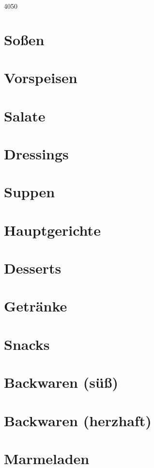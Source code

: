 \documentclass[11pt, a4paper, twoside]{book} %
\makeatletter
\newcommand\HUGE{\@setfontsize\Huge{40}{50}}
\makeatother
\begin{document}
\renewcommand{\indexname}{Stichwortverzeichnis}

\justify
\setlength\parindent{0pt}

\thispagestyle{empty}
\vspace*{3cm}
\begin{center}
{\HUGE{\textsc{}}}
\vspace{2cm}
\end{center}
\vspace{3cm}
\newpage

\tableofcontents

\cleardoublepage
{}
\printindex

\cleardoublepage
{}

\chapter{So\ss{}en}
\thispagestyle{empty}

\chapter{Vorspeisen}
\thispagestyle{empty}

\chapter{Salate}
\thispagestyle{empty}

\chapter{Dressings}
\thispagestyle{empty}

\chapter{Suppen}
\thispagestyle{empty}

\chapter{Hauptgerichte}
\thispagestyle{empty}

\chapter{Desserts}
\thispagestyle{empty}

\chapter{Getr\"anke}
\thispagestyle{empty}

\chapter{Snacks}
\thispagestyle{empty}

\chapter{Backwaren (süß)}
\thispagestyle{empty}

\chapter{Backwaren (herzhaft)}
\thispagestyle{empty}

\chapter{Marmeladen}
\thispagestyle{empty}

\end{document}
